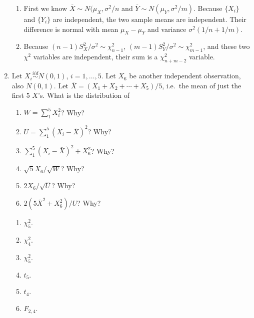 \documentclass[12pt]{article}
\begin{document}
\begin{enumerate}
\hrulefill

\begin{enumerate}
\item
First we know
$\overline{X} \sim N(\mu_X, \sigma^2/n$ and
$\overline{Y} \sim N(\mu_Y, \sigma^2/m)$.
Because $\{X_i\}$ and $\{Y_i\}$ are independent,
the two sample means are independent.
Their difference is normal with mean
$\mu_X - \mu_Y$ and variance $\sigma^2(1/n + 1/m)$.

\item
Because
$(n-1)S^2_{X}/\sigma^2 \sim \chi^2_{n-1}$,
$(m-1)S^2_{Y}/\sigma^2 \sim \chi^2_{m-1}$,
and these two $\chi^2$ variables are independent,
their sum is a $\chi^2_{n+m-2}$ variable.
\end{enumerate}

\item Let $X_i \stackrel{iid}{\sim} N(0,1)$, $i=1,\ldots,5.$
Let $X_6$ be another independent observation, also $N(0,1)$.
Let $\bar{X} = (X_1 + X_2 + \cdots + X_5)/5$, i.e.\ the mean of just the first 5 $X$'s.
 What is the distribution of
\begin{enumerate}
\item $W = \sum_1^5 X_i^2$? Why?
\item $U = \sum_1^5 (X_i-\bar{X})^2$? Why?
\item $\sum_1^5 (X_i-\bar{X})^2+X_6^2$?  Why?
\item $\sqrt{5}X_6/\sqrt{W}$? Why?
\item $2X_6/\sqrt{U}$? Why?
\item $2(5\bar{X}^2 + X_6^2)/U$? Why?
\end{enumerate}

\hrulefill

\begin{enumerate}
\item $\chi^2_5$.
\item $\chi^2_4$.
\item $\chi^2_5$.
\item $t_5$.
\item $t_4$.
\item $F_{2,4}$.
\end{enumerate}

\end{enumerate}
\end{document}
